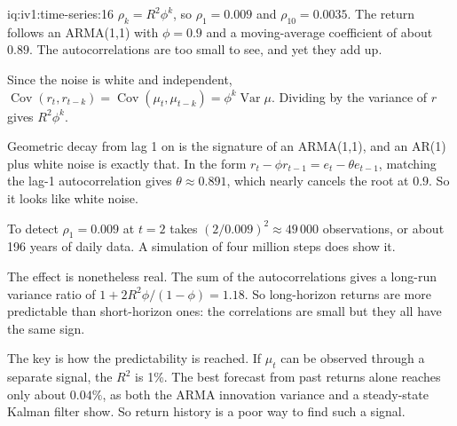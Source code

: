 \begin{solution}{iq:iv1:time-series:16}
$\rho_k = R^2\phi^k$, so $\rho_1 = 0.009$ and $\rho_{10} = 0.0035$. The return follows an ARMA(1,1) with $\phi = 0.9$ and a moving-average coefficient of about $0.89$. The autocorrelations are too small to see, and yet they add up.

Since the noise is white and independent, $\operatorname{Cov}(r_t, r_{t - k}) = \operatorname{Cov}(\mu_t, \mu_{t - k}) = \phi^k\operatorname{Var}\mu$. Dividing by the variance of $r$ gives $R^2\phi^k$.

Geometric decay from lag 1 on is the signature of an ARMA(1,1), and an AR(1) plus white noise is exactly that. In the form $r_t - \phi r_{t - 1} = e_t - \theta e_{t - 1}$, matching the lag-1 autocorrelation gives $\theta \approx 0.891$, which nearly cancels the root at $0.9$. So it looks like white noise.

To detect $\rho_1 = 0.009$ at $t = 2$ takes $(2/0.009)^2 \approx 49\,000$ observations, or about 196 years of daily data. A simulation of four million steps does show it.

The effect is nonetheless real. The sum of the autocorrelations gives a long-run variance ratio of $1 + 2R^2\phi/(1 - \phi) = 1.18$. So long-horizon returns are more predictable than short-horizon ones: the correlations are small but they all have the same sign.

The key is how the predictability is reached. If $\mu_t$ can be observed through a separate signal, the $R^2$ is 1\%. The best forecast from past returns alone reaches only about $0.04\%$, as both the ARMA innovation variance and a steady-state Kalman filter show. So return history is a poor way to find such a signal.



\end{solution}

